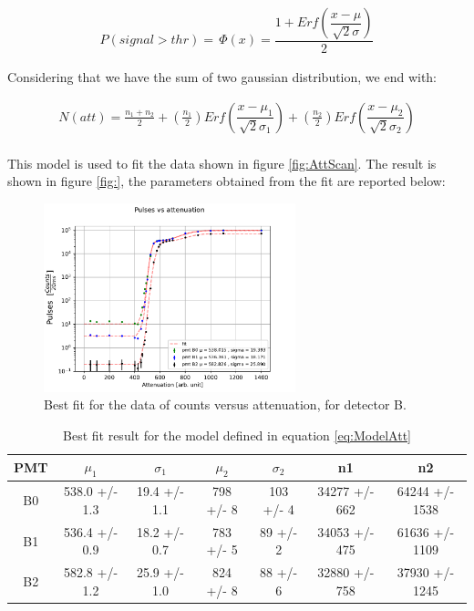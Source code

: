 \begin{align*}
P(signal > thr) = \, \Phi(x) = \dfrac{1 + Erf(\dfrac{x - \mu}{\sqrt{2} \sigma })}{2}
\end{align*}

Considering that we have the sum of two gaussian distribution, we end with:

\begin{equation} \label{eq:ModelAtt}
\begin{split}
N(att) = \frac{n_{1} + n_{2}}{2} + (\frac{n_{1}}{2}) Erf(\dfrac{x - \mu_{1}}{\sqrt{2} \sigma_{1} })   + (\frac{n_{2}}{2}) Erf(\dfrac{x - \mu_{2}}{\sqrt{2} \sigma_{2}}) \\
\end{split}
\end{equation}

This model is used to fit the data shown in figure \ref{fig:AttScan}. The result is shown in figure \ref{fig:}, the parameters obtained from the fit are reported below:

\begin{figure}[!ht]
\centering
\includegraphics[width = 0.65\textwidth ]{Analysis/CalibrationPMT/Fit_attenuation.pdf}
\caption{Best fit for the data of counts versus attenuation, for detector B.}
\end{figure}

\begin{table}[!ht]
\centering
\begin{tabular}{c|c|c|c|c|c|c}
\hline
 PMT   &  $\mu_{1}$         &  $\sigma_{1}$         & $\mu_{2}$          & $\sigma_{2}$   & n1                & n2                 \\
\hline
 B0    & 538.0 +/- 1.3 & 19.4 +/- 1.1 & 798 +/- 8 & 103 +/- 4 & 34277 +/- 662 & 64244 +/- 1538 \\
 B1    & 536.4 +/- 0.9 & 18.2 +/- 0.7 & 783 +/- 5 & 89 +/- 2  & 34053 +/- 475 & 61636 +/- 1109 \\
 B2    & 582.8 +/- 1.2 & 25.9 +/- 1.0 & 824 +/- 8 & 88 +/- 6  & 32880 +/- 758 & 37930 +/- 1245 \\
\hline
\end{tabular}
\caption{Best fit result for the model defined in equation \ref{eq:ModelAtt}}
\end{table}

